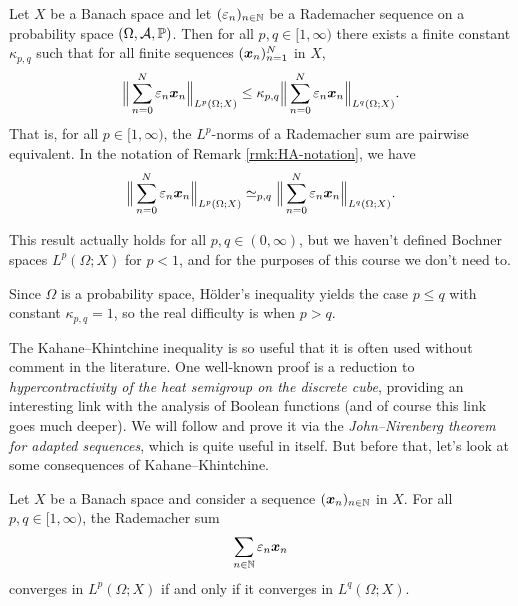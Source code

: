 \begin{thm}\label{thm:kk}
  Let $X$ be a Banach space and let $(\varepsilon_{n})_{n \in \mathbb{N}}$ be a Rademacher sequence on a probability space $(\Omega,\mathcal{A},\mathbb{P})$.
  Then for all $p,q \in [1,\infty)$ there exists a finite constant $\kappa_{p,q}$ such that for all finite sequences $(\bm{x}_n)_{n=1}^N$ in $X$,
  \begin{equation*}
    \Big\|\sum_{n=0}^{N} \varepsilon_{n} \bm{x}_{n} \Big\|_{L^p(\Omega;X)}
    \leq \kappa_{p,q} \Big\|\sum_{n=0}^{N} \varepsilon_{n} \bm{x}_{n} \Big\|_{L^q(\Omega;X)}.
  \end{equation*}
  That is, for all $p \in [1,\infty)$, the $L^p$-norms of a Rademacher sum are pairwise equivalent.
  In the notation of Remark \ref{rmk:HA-notation}, we have
  \begin{equation*}
    \Big\|\sum_{n=0}^{N} \varepsilon_{n} \bm{x}_{n} \Big\|_{L^p(\Omega;X)} \simeq_{p,q} \Big\|\sum_{n=0}^{N} \varepsilon_{n} \bm{x}_{n} \Big\|_{L^q(\Omega;X)}.
  \end{equation*}
\end{thm}

\begin{rmk}
  This result actually holds for all $p,q \in (0,\infty)$, but we haven't defined Bochner spaces $L^p(\Omega;X)$ for $p < 1$, and for the purposes of this course we don't need to.
\end{rmk}

Since $\Omega$ is a probability space, H\"older's inequality yields the case $p \leq q$ with constant $\kappa_{p,q} = 1$, so the real difficulty is when $p > q$.

The Kahane--Khintchine inequality is so useful that it is often used without comment in the literature.
One well-known proof is a reduction to \emph{hypercontractivity of the heat semigroup on the discrete cube}, providing an interesting link with the analysis of Boolean functions (and of course this link goes much deeper).
We will follow \cite{HNVW16} and prove it via the \emph{John--Nirenberg theorem for adapted sequences}, which is quite useful in itself.
But before that, let's look at some consequences of Kahane--Khintchine.

\begin{prop}
  Let $X$ be a Banach space and consider a sequence $(\bm{x}_{n})_{n \in \mathbb{N}}$ in $X$.
  For all $p,q \in [1,\infty)$, the Rademacher sum
  \begin{equation}\label{eq:rad-sum-example}
    \sum_{n \in \mathbb{N}} \varepsilon_{n} \bm{x}_{n}
  \end{equation}
  converges in $L^p(\Omega;X)$ if and only if it converges in $L^q(\Omega;X)$.
\end{prop}


